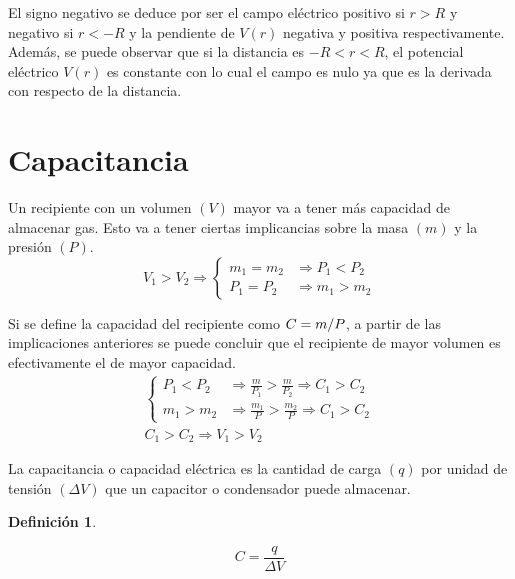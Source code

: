 \documentclass[a5paper,12pt,twoside]{book}
\newtheorem{defn}{{Definición}}[chapter]
\begin{document}
\begin{center}
    \def\svgwidth{0.8\linewidth}
    
\end{center}

El signo negativo se deduce por ser el campo eléctrico positivo si $r>R$ y negativo si $r<-R$ y la pendiente de $V(r)$ negativa y positiva respectivamente. Además, se puede observar que si la distancia es $-R<r<R$, el potencial eléctrico $V(r)$ es constante con lo cual el campo es nulo ya que es la derivada con respecto de la distancia.


\section{Capacitancia}

Un recipiente con un volumen $(V)$ mayor va a tener más capacidad de almacenar gas. Esto va a tener ciertas implicancias sobre la masa $(m)$ y la presión $(P)$.
\begin{equation*}
    V_1 > V_2 \Rightarrow
    \left\{
    \begin{aligned}
        m_1 = m_2 & \Rightarrow P_1 < P_2
        \\
        P_1 = P_2 & \Rightarrow m_1 > m_2
    \end{aligned}
    \right.
\end{equation*}

Si se define la capacidad del recipiente como $C= m/P$, a partir de las implicaciones anteriores se puede concluir que el recipiente de mayor volumen es efectivamente el de mayor capacidad.
\begin{gather*}
    \left\{
    \begin{aligned}
        P_1 < P_2 & \Rightarrow \frac{m}{P_1} > \frac{m}{P_2} \Rightarrow C_1 > C_2
        \\[1ex]
        m_1 > m_2 & \Rightarrow \frac{m_1}{P} > \frac{m_2}{P} \Rightarrow C_1 > C_2
    \end{aligned}
    \right.
    \\[1em]
    C_1 > C_2 \Rightarrow V_1 > V_2
\end{gather*}

La capacitancia o capacidad eléctrica es la cantidad de carga $(q)$ por unidad de tensión $(\Delta V)$ que un capacitor o condensador puede almacenar.

\begin{mdframed}[style=MyFrame1]
    \begin{defn}
    \end{defn}
    \begin{equation*}
        C = \frac{q}{\Delta V}
    \end{equation*}
\end{mdframed}
\end{document}
